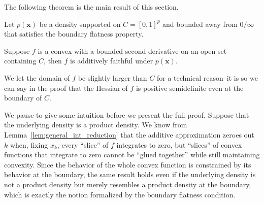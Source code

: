 
The following theorem is the main result of this section.

\begin{theorem}
\label{thm:convex_faithful}
Let $p(\mathbf{x})$ be a density supported on $C=[0,1]^p$ and bounded away from $0/\infty$ that satisfies the boundary flatness property. 

Suppose $f$ is a convex with a bounded second derivative on an open set containing $C$, then $f$ is additively faithful under $p(\mathbf{x})$.
\end{theorem}

We let the domain of $f$ be slightly larger than $C$ for a technical reason--it is so we can say in the proof that the Hessian of $f$ is positive semidefinite even at the boundary of $C$. 


We pause to give some intuition before we present the full proof.
Suppose that the underlying density is a product density.  We know
from Lemma~\ref{lem:general_int_reduction} that the additive
approximation zeroes out $k$ when, fixing $x_k$, every ``slice'' of
$f$ integrates to zero, but ``slices'' of convex functions that
integrate to zero cannot be ``glued together'' while still maintaining
convexity. Since the behavior of the whole convex function is
constrained by its behavior at the boundary, the same result holds
even if the underlying density is not a product density but merely
resembles a product density at the boundary, which is exactly the
notion formalized by the boundary flatness condition.

